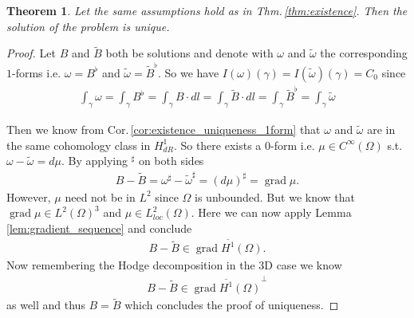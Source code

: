 \documentclass[12pt,a4paper]{article}
\numberwithin{equation}{subsection}
\numberwithin{lemma}{subsection}
\newtheorem{theorem}[lemma]{Theorem}
\theoremstyle{definition}
\DeclareMathOperator{\grad}{grad}
\newcommand{\rop}{\mathscr{R}} %
\begin{document}
\begin{theorem}
    Let the same assumptions hold as in Thm.\,\ref{thm:existence}.
    Then the solution of the problem is unique.
\end{theorem}

\begin{proof}
    Let $B$ and $\tilde{B}$ both be solutions and denote with $\omega$ 
    and $\tilde{\omega}$ the corresponding $1$-forms i.e. $\omega =
    B^\flat$ and $\tilde{\omega} = \tilde{B}^\flat$. 
    So we have $I(\omega)(\gamma) = I(\tilde{\omega})(\gamma) = C_0$
    since 
    \begin{align*}
        \int_\gamma \omega = \int_\gamma B^\flat = 
        \int_\gamma B \cdot dl = \int_\gamma \tilde{B}\cdot dl 
        = \int_\gamma \tilde{B}^\flat = \int_\gamma \tilde{\omega}
    \end{align*}

    Then we know from Cor.\,\ref{cor:existence_uniqueness_1form} 
    that $\omega$ and $\tilde{\omega}$ are in the 
    same cohomology class in $H^1_{dR}$. So there exists a $0$-form i.e. 
    $\mu \in C^\infty(\Omega)$ s.t. $\omega - \tilde{\omega} = d\mu$.
    By applying $^\sharp$ on both sides
    \begin{align*}
        B - \tilde{B} 
        = \omega^\sharp - \tilde{\omega}^\sharp
        = (d\mu)^\sharp = \grad \mu.
    \end{align*}
    However, $\mu$ need not be in $L^2$ since $\Omega$ is unbounded.
    But we know that $\grad \mu \in L^2(\Omega)^3$ and 
    $\mu \in L^2_{loc}(\Omega)$. 
    Here we can now apply Lemma \ref{lem:gradient_sequence} and conclude
    \begin{align*}
        B - \tilde{B} \in \overline{\grad H^1(\Omega)}.
    \end{align*}
    Now remembering the Hodge decomposition in the 3D case we know 
    \begin{align*}
        B - \tilde{B} \in \overline{\grad H^1(\Omega)}^\perp
    \end{align*}
    as well and thus $B = \tilde{B}$ which concludes the proof of uniqueness.
\end{proof}


    
\end{document}
